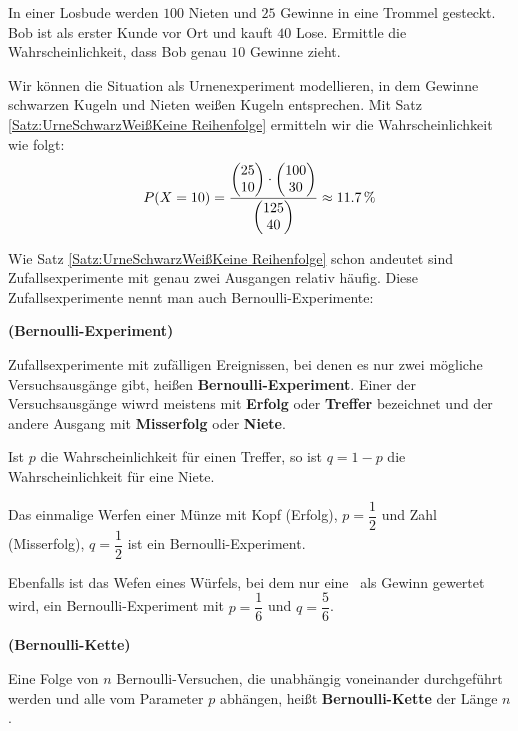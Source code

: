\documentclass[ngerman, 12pt]{nssheetxea}
\begin{document}
\begin{example}
In einer Losbude werden $100$ Nieten und $25$ Gewinne in eine Trommel gesteckt. Bob ist als erster Kunde vor Ort und kauft $40$ Lose. Ermittle die Wahrscheinlichkeit, dass Bob genau $10$ Gewinne zieht. \par
Wir können die Situation als Urnenexperiment modellieren, in dem Gewinne schwarzen Kugeln und Nieten weißen Kugeln entsprechen. Mit Satz \ref{Satz:UrneSchwarzWeißKeine Reihenfolge} ermitteln wir die Wahrscheinlichkeit wie folgt:
\[ P(X=10) = \dfrac{\colvec{25}{10}\cdot \colvec{100}{30}}{\colvec{125}{40}} \approx \SI{11,7}{\percent}  \]
\end{example}

Wie Satz \ref{Satz:UrneSchwarzWeißKeine Reihenfolge} schon andeutet sind Zufallsexperimente mit genau zwei Ausgangen relativ häufig. Diese Zufallsexperimente nennt man auch Bernoulli-Experimente:

\begin{definition} \textbf{(Bernoulli-Experiment)} \par
Zufallsexperimente mit zufälligen Ereignissen, bei denen es nur zwei mögliche Versuchsausgänge gibt, heißen \textbf{Bernoulli-Experiment}. Einer der Versuchsausgänge wiwrd meistens mit \textbf{Erfolg} oder \textbf{Treffer} bezeichnet und der andere Ausgang mit \textbf{Misserfolg} oder \textbf{Niete}. \par
Ist $p$ die Wahrscheinlichkeit für einen Treffer, so ist $q=1-p$ die Wahrscheinlichkeit für eine Niete.
\end{definition}

\begin{example}
Das einmalige Werfen einer Münze mit Kopf (Erfolg), $p=\dfrac{1}{2}$ und Zahl (Misserfolg), $q=\dfrac{1}{2}$ ist ein Bernoulli-Experiment. \par
Ebenfalls ist das Wefen eines Würfels, bei dem nur eine \grqq \ als Gewinn gewertet wird, ein Bernoulli-Experiment mit $p=\dfrac{1}{6}$ und $q=\dfrac{5}{6}$.
\end{example}

\begin{definition} \textbf{(Bernoulli-Kette)} \par
Eine Folge von $n$ Bernoulli-Versuchen, die unabhängig voneinander durchgeführt werden und alle vom Parameter $p$ abhängen, heißt \textbf{Bernoulli-Kette} der Länge $n$. 
\end{definition}
\end{document}

